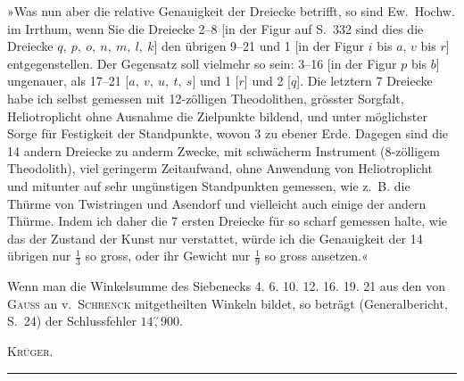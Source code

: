 \par\noindent\hspace*{\parindent}»Was nun aber die relative Genauigkeit der Dreiecke betrifft, so sind Ew.~Hochw. im Irrthum, wenn Sie die Dreiecke 2--8 [in der Figur auf S.~332 sind dies die Dreiecke \(q,\ p,\ o,\ n,\ m,\ l,\ k\)] den übrigen 9--21 und 1 [in der Figur \(i\) bis \(a\), \(v\) bis \(r\)] entgegenstellen. Der Gegensatz soll vielmehr so sein: 3--16 [in der Figur \(p\) bis \(b\)]  ungenauer, als 17--21 [\(a,\ v,\ u,\ t,\ s\)] und 1 [\(r\)] und 2 [\(q\)]. Die letztern 7 Dreiecke habe ich selbst gemessen mit 12-zölligen Theodolithen, grösster Sorgfalt, Heliotroplicht ohne Ausnahme die Zielpunkte bildend, und unter möglichster Sorge für Festigkeit der Standpunkte, wovon 3 zu ebener Erde. Dagegen sind die 14 andern Dreiecke zu anderm Zwecke, mit schwächerm Instrument (8-zölligem Theodolith), viel geringerm Zeitaufwand, ohne Anwendung von Heliotroplicht und mitunter auf sehr ungünstigen Standpunkten gemessen, wie z.~B. die Thürme von Twistringen und Asendorf und vielleicht auch einige der andern Thürme. Indem ich daher die 7 ersten Dreiecke für so scharf gemessen halte, wie das der Zustand der Kunst nur verstattet, würde ich die Genauigkeit der 14 übrigen nur \(\frac{1}{3}\) so gross, oder ihr Gewicht nur \(\frac{1}{9}\) so gross ansetzen.«

\par\noindent\hspace*{\parindent}Wenn man die Winkelsumme des Siebenecks 4. 6. 10. 12. 16. 19. 21 aus den von \textsc{Gauss} an v.~\textsc{Schrenck} mitgetheilten Winkeln bildet, so beträgt (Generalbericht, S.~24) der Schlussfehler \(14\overset{\prime\prime}{,}900\).
\begin{flushright}\textsc{Krüger.}\end{flushright}
\begin{center}\rule{.26\textwidth}{.4pt}\end{center}
